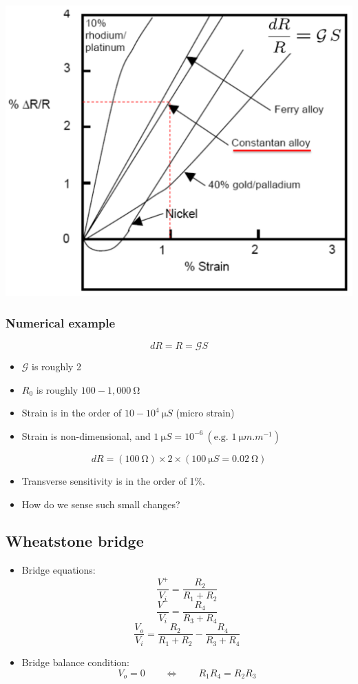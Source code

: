 \documentclass[11pt]{article}
\begin{document}
\begin{center}
\includegraphics[width=.9\linewidth]{./images/strain-gauge-materials-diagram.png}
\end{center}

 \newpage
\subsubsection{Numerical example}
\label{sec:orgfc59d66}
\[dR = R = \mathcal{G} S\]
\begin{itemize}
\item \(\mathcal{G}\) is roughly 2
\item \(R_0\) is roughly \(100 - 1,000 \ \unit{\ohm}\)
\item Strain is in the order of \(10 - 10^4 \ \unit{\micro S}\) (micro strain)
\item Strain is non-dimensional, and \(\qty{1}{\micro S} = 10^{-6} \ (\text{e.g. } \qty{1}{\micro m.m^{-1}})\)
\end{itemize}

\[dR = (\qty{100}{\ohm}) \times 2 \times (\qty{100}{\micro S} = \qty{0.02}{\ohm})\]
\begin{itemize}
\item Transverse sensitivity is in the order of 1\%.
\item How do we sense such small changes?
\end{itemize}

 \newpage
\subsection{Wheatstone bridge}
\label{sec:org7297a22}
\begin{itemize}
\item Bridge equations:
\[\frac{V^+}{V_i} = \frac{R_2}{R_1 + R_2}\]
\[\frac{V^-}{V_i} = \frac{R_4}{R_3 + R_4}\]
\[\frac{V_o}{V_i} = \frac{R_2}{R_1 + R_2} - \frac{R_4}{R_3 + R_4}\]
\item Bridge balance condition:
\[V_o = 0 \qquad \Leftrightarrow \qquad R_1 R_4 = R_2 R_3\]
\end{itemize}
\end{document}
